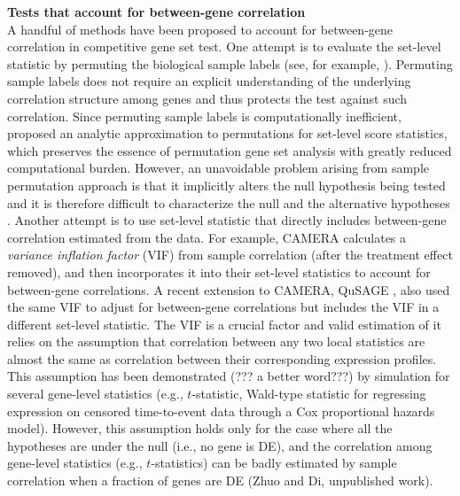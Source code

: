 \documentclass[useAMS,usenatbib, galley]{biom}
\newcommand{\thepapertobefinished}{Zhuo and Di, unpublished work}
\begin{document}
	\textbf{Tests that account for between-gene correlation}\\
	A handful of methods have been proposed to account for between-gene correlation in competitive gene set test. One attempt is to evaluate the set-level statistic by permuting the biological sample labels (see, for example, \cite{subramanian2005gene, efron2007testing}). Permuting sample labels does not require an explicit understanding of the underlying correlation structure among genes and thus protects the test against such correlation. Since permuting sample labels is computationally inefficient, \cite{zhou2013empirical} proposed an analytic approximation to permutations for set-level score statistics, which preserves the essence of permutation gene set analysis with greatly reduced computational burden. However, an unavoidable problem arising from sample permutation approach is that it implicitly alters the null hypothesis being tested and it is therefore difficult to characterize the null and the alternative hypotheses \citep{goeman2007analyzing, khatri2012ten, wu2012camera}. Another attempt is to use set-level statistic that directly includes between-gene correlation estimated from the data. For example, CAMERA \citep{wu2012camera} calculates a \textit{variance inflation factor} (VIF) from sample correlation (after the treatment effect removed), and then incorporates it into their set-level statistics to account for between-gene correlations. A recent extension to CAMERA,  QuSAGE \citep{yaari2013quantitative}, also used the same VIF to adjust for between-gene correlations but includes the VIF in a different set-level statistic. The VIF is a crucial factor and valid estimation of it relies on the assumption that correlation between any two local statistics are almost the same as correlation between their corresponding expression profiles. This assumption has been demonstrated (??? a better word???) by simulation \citep{barry2008statistical} for several gene-level statistics (e.g., $t$-statistic, Wald-type statistic for regressing expression on censored time-to-event data through a Cox proportional hazards model). However, this assumption holds only for the case where all the hypotheses are under the null (i.e., no gene is DE), and the correlation among gene-level statistics (e.g., $t$-statistics) can be badly estimated by sample correlation when a fraction of genes are DE (\thepapertobefinished). 
	
\end{document}
